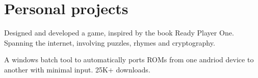 \documentclass[]{font}
\begin{document}
\begin{minipage}[t]{0.66\textwidth}


\sectionsep



\section{Personal projects}

Designed and developed a game, inspired by the book Ready Player One. Spanning the internet, involving puzzles, rhymes and cryptography.
\sectionsep


A windows batch tool to automatically ports ROMs from one andriod device to another with minimal input. 25K+ downloads.
\sectionsep

\end{minipage} 
\end{document}
